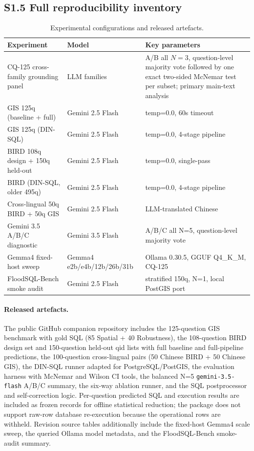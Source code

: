 \documentclass[11pt]{article}
\begin{document}
\subsection*{S1.5 Full reproducibility inventory}

\begin{table}[h]
\centering\footnotesize
\caption{Experimental configurations and released artefacts.}
\label{tab:repro-supp}
{\setlength{\tabcolsep}{4pt}
\begin{tabular}{>{\raggedright\arraybackslash}p{3.7cm}>{\raggedright\arraybackslash}p{3.5cm}>{\raggedright\arraybackslash}p{7.5cm}}
\toprule
Experiment & Model & Key parameters \\
\midrule
CQ-125 cross-family grounding panel & 11 LLM families & A/B all $N=3$, question-level majority vote followed by one exact two-sided McNemar test per subset; primary main-text analysis \\
GIS 125q (baseline + full) & Gemini 2.5 Flash & temp=0.0, 60s timeout \\
GIS 125q (DIN-SQL) & Gemini 2.5 Flash & temp=0.0, 4-stage pipeline \\
BIRD 108q design + 150q held-out & Gemini 2.5 Flash & temp=0.0, single-pass \\
BIRD (DIN-SQL, older 495q) & Gemini 2.5 Flash & temp=0.0, 4-stage pipeline \\
Cross-lingual 50q BIRD + 50q GIS & Gemini 2.5 Flash & LLM-translated Chinese \\
Gemini 3.5 A/B/C diagnostic & Gemini 3.5 Flash & A/B/C all N=5, question-level majority vote \\
Gemma4 fixed-host sweep & Gemma4 e2b/e4b/12b/26b/31b & Ollama 0.30.5, GGUF Q4\_K\_M, CQ-125 \\
FloodSQL-\allowbreak{}Bench smoke audit & Gemini 2.5 Flash & stratified 150q, N=1, local PostGIS port \\
\bottomrule
\end{tabular}
}
\end{table}

\paragraph{Released artefacts.} The public GitHub companion repository includes the
125-question GIS benchmark with gold SQL (85 Spatial + 40 Robustness), the
108-question BIRD design set and 150-question held-out qid lists with full baseline
and full-pipeline predictions, the 100-question cross-lingual pairs (50 Chinese
BIRD + 50 Chinese GIS), the DIN-SQL runner adapted for PostgreSQL/PostGIS, the
evaluation harness with McNemar and Wilson CI tools, the balanced N=5
\texttt{gemini-3.5-flash} A/B/C summary, the six-way ablation runner,
and the SQL postprocessor and self-correction logic. Per-question predicted SQL
and execution results are included as frozen records for offline statistical
reduction; the package does not support raw-row database re-execution because the
operational rows are withheld. Revision source tables additionally include
the fixed-host Gemma4 scale sweep, the queried Ollama model metadata, and the
FloodSQL-Bench smoke-audit summary.
\end{document}
